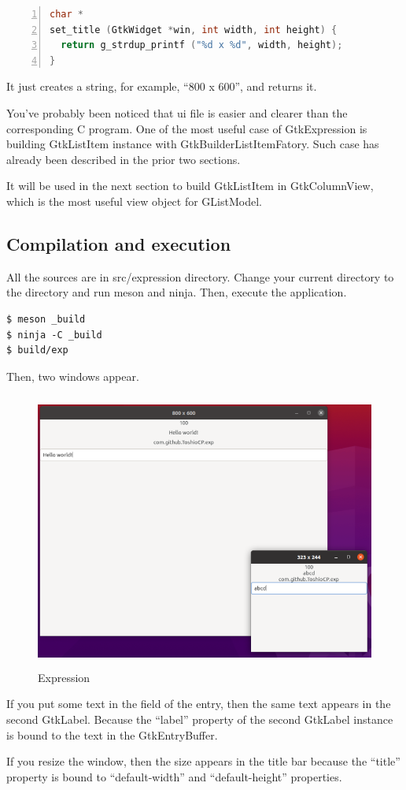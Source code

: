 \begin{lstlisting}[language=C, numbers=left]
char *
set_title (GtkWidget *win, int width, int height) {
  return g_strdup_printf ("%d x %d", width, height);
}
\end{lstlisting}

It just creates a string, for example, ``800 x 600'', and returns it.

You've probably been noticed that ui file is easier and clearer than the
corresponding C program. One of the most useful case of GtkExpression is
building GtkListItem instance with GtkBuilderListItemFatory. Such case
has already been described in the prior two sections.

It will be used in the next section to build GtkListItem in
GtkColumnView, which is the most useful view object for GListModel.

\hypertarget{compilation-and-execution}{%
\subsection{Compilation and execution}\label{compilation-and-execution}}

All the sources are in src/expression directory. Change your current
directory to the directory and run meson and ninja. Then, execute the
application.

\begin{lstlisting}
$ meson _build
$ ninja -C _build
$ build/exp
\end{lstlisting}

Then, two windows appear.

\begin{figure}
\centering
\includegraphics[width=12cm,height=9.1cm]{../image/expression.png}
\caption{Expression}
\end{figure}

If you put some text in the field of the entry, then the same text
appears in the second GtkLabel. Because the ``label'' property of the
second GtkLabel instance is bound to the text in the GtkEntryBuffer.

If you resize the window, then the size appears in the title bar because
the ``title'' property is bound to ``default-width'' and
``default-height'' properties.
